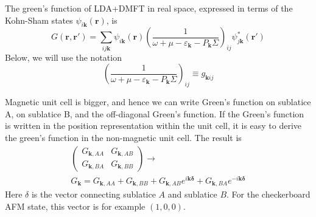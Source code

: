 \documentclass[aps,prb,floatfix,epsfig,twocolumn,showpacs,preprintnumbers]{revtex4}
\renewcommand{\vr}{{\mathbf{r}}}
\newcommand{\vk}{{\mathbf{k}}}
\newcommand{\vdelta}{{\mathbf{\delta}}}
\begin{document}
The green's function of LDA+DMFT in real space, expressed in terms of
the Kohn-Sham states $\psi_{i\vk}(\vr)$, is
\begin{equation}
 G(\vr,\vr') = \sum_{ij\vk}\psi_{i\vk}(\vr)\left(\frac{1}{\omega+\mu-\varepsilon_\vk-P_\vk\Sigma}\right)_{ij}\psi_{j\vk}^*(\vr')
\end{equation}
Below, we will use the notation
\begin{equation}
  \left(\frac{1}{\omega+\mu-\varepsilon_\vk-P_\vk\Sigma}\right)_{ij}\equiv  g_{\vk ij}
\end{equation}


Magnetic unit cell is bigger, and hence we can write Green's function
on sublatice A, on sublatice B, and the off-diagonal Green's function.
If the Green's function is written in the position representation
within the unit cell, it is easy to derive the green's function in the
non-magnetic unit cell. The result is
\begin{eqnarray}
\left(
\begin{array}{cc}
 G_{\vk,AA} & G_{\vk,AB}\\
 G_{\vk,BA} & G_{\vk,BB}
\end{array}
\right)
\rightarrow\\
G_{\vk} = G_{\vk,AA} + G_{\vk,BB} + G_{\vk,AB} e^{i\vk\vdelta} + G_{\vk,BA}e^{-i\vk\vdelta}
\end{eqnarray}
Here $\delta$ is the vector connecting sublatice $A$ and sublatice
$B$. For the checkerboard AFM state, this vector is for example $(1,0,0)$. 
\end{document}
